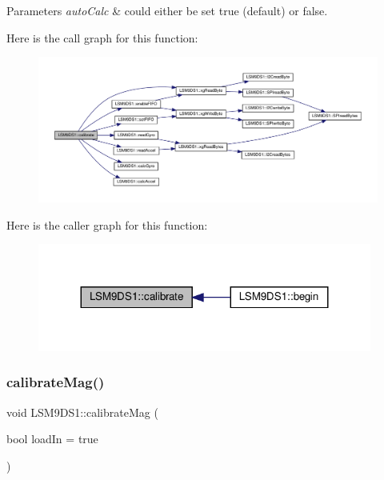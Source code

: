 \begin{DoxyParams}{Parameters}
{\em auto\+Calc} & could either be set true (default) or false. \\
\hline
\end{DoxyParams}
Here is the call graph for this function\+:\nopagebreak
\begin{figure}[H]
\begin{center}
\leavevmode
\includegraphics[width=350pt]{classLSM9DS1_a97939cb15fcb7e33abcd6d3a9230d943_cgraph}
\end{center}
\end{figure}
Here is the caller graph for this function\+:\nopagebreak
\begin{figure}[H]
\begin{center}
\leavevmode
\includegraphics[width=311pt]{classLSM9DS1_a97939cb15fcb7e33abcd6d3a9230d943_icgraph}
\end{center}
\end{figure}
\mbox{\label{classLSM9DS1_afb45f0bcbcbeb15d4bd1a28821b24d14}} 
\subsubsection{\texorpdfstring{calibrate\+Mag()}{calibrateMag()}}
{\footnotesize\ttfamily void L\+S\+M9\+D\+S1\+::calibrate\+Mag (\begin{DoxyParamCaption}\item[{bool}]{load\+In = {\ttfamily true} }\end{DoxyParamCaption})}



